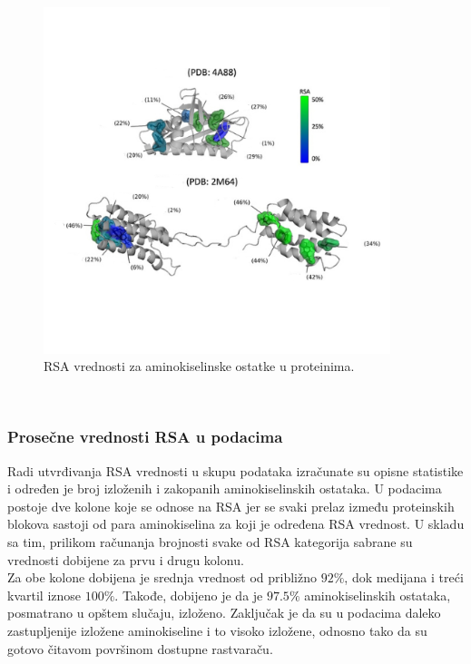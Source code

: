 \documentclass[a4paper,12pt]{article}
\begin{document}
\begin{figure}[htbp]
    \centering
    \includegraphics[width=0.9\textwidth]{./images/rsa.png}
    \caption{RSA vrednosti za aminokiselinske ostatke u proteinima.}
    \label{Slika:rsa}
\end{figure}
\\
\subsubsection{Prosečne vrednosti RSA u podacima}
Radi utvrđivanja RSA vrednosti u skupu podataka izračunate su opisne statistike i određen je broj izloženih i zakopanih aminokiselinskih ostataka. U podacima postoje dve kolone koje se odnose na RSA jer se svaki prelaz između proteinskih blokova sastoji od para aminokiselina za koji je određena RSA vrednost. U skladu sa tim, prilikom računanja brojnosti svake od RSA kategorija sabrane su vrednosti dobijene za prvu i drugu kolonu. \\
Za obe kolone dobijena je srednja vrednost od približno $92\%$, dok medijana i treći kvartil iznose $100\%$. Takođe, dobijeno je da je $97.5\%$ aminokiselinskih ostataka, posmatrano u opštem slučaju, izloženo. Zaključak je da su u podacima daleko zastupljenije izložene aminokiseline i to visoko izložene, odnosno tako da su gotovo čitavom površinom dostupne rastvaraču.
\end{document}

